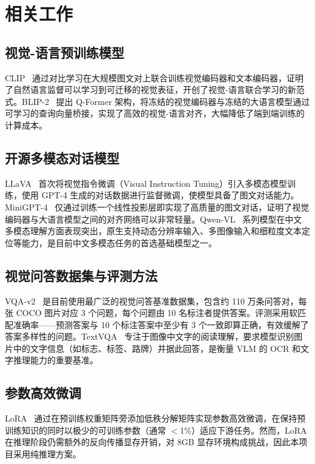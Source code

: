 \documentclass{SYSUReport}
\begin{document}
\section{相关工作}

\subsection{视觉-语言预训练模型}

CLIP~\cite{radford2021clip} 通过对比学习在大规模图文对上联合训练视觉编码器和文本编码器，证明了自然语言监督可以学习到可迁移的视觉表征，开创了视觉-语言联合学习的新范式。BLIP-2~\cite{li2023blip2} 提出 Q-Former 架构，将冻结的视觉编码器与冻结的大语言模型通过可学习的查询向量桥接，实现了高效的视觉-语言对齐，大幅降低了端到端训练的计算成本。

\subsection{开源多模态对话模型}

LLaVA~\cite{liu2023llava} 首次将视觉指令微调（Visual Instruction Tuning）引入多模态模型训练，使用 GPT-4 生成的对话数据进行监督微调，使模型具备了图文对话能力。MiniGPT-4~\cite{zhu2023minigpt4} 仅通过训练一个线性投影层即实现了高质量的图文对话，证明了视觉编码器与大语言模型之间的对齐网络可以非常轻量。Qwen-VL~\cite{bai2024qwen} 系列模型在中文多模态理解方面表现突出，原生支持动态分辨率输入、多图像输入和细粒度文本定位等能力，是目前中文多模态任务的首选基础模型之一。

\subsection{视觉问答数据集与评测方法}

VQA-v2~\cite{goyal2017vqa} 是目前使用最广泛的视觉问答基准数据集，包含约 110 万条问答对，每张 COCO 图片对应 3 个问题，每个问题由 10 名标注者提供答案。评测采用软匹配准确率——预测答案与 10 个标注答案中至少有 3 个一致即算正确，有效缓解了答案多样性的问题。TextVQA~\cite{singh2019textvqa} 专注于图像中文字的阅读理解，要求模型识别图片中的文字信息（如标志、标签、路牌）并据此回答，是衡量 VLM 的 OCR 和文字推理能力的重要基准。

\subsection{参数高效微调}

LoRA~\cite{hu2022lora} 通过在预训练权重矩阵旁添加低秩分解矩阵实现参数高效微调，在保持预训练知识的同时以极少的可训练参数（通常 $<$1\%）适应下游任务。然而，LoRA 在推理阶段仍需额外的反向传播显存开销，对 8GB 显存环境构成挑战，因此本项目采用纯推理方案。
\end{document}
